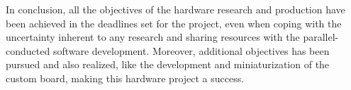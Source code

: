 


		In conclusion, all the objectives of the hardware research and production have been achieved in the deadlines set for the project, even when coping with the uncertainty inherent to any research and sharing resources with the parallel-conducted software development. Moreover, additional objectives has been pursued and also realized, like the development and miniaturization of the custom board, making this hardware project a success.
		
		
